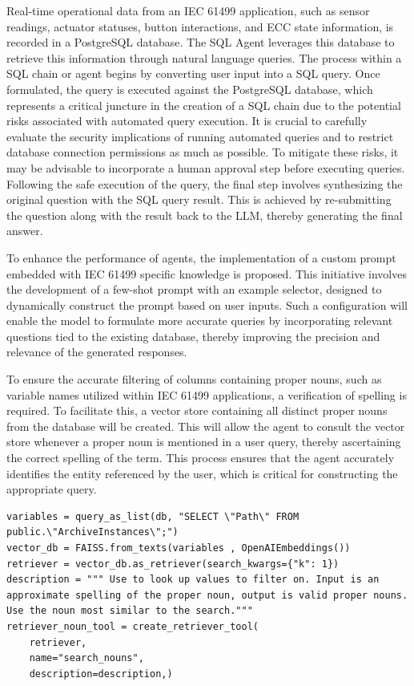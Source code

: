 \begin{bibunit}
Real-time operational data from an IEC 61499 application, such as sensor readings, actuator statuses, button interactions, and ECC state information, is recorded in a PostgreSQL database. The SQL Agent leverages this database to retrieve this information through natural language queries. The process within a SQL chain or agent begins by converting user input into a SQL query. Once formulated, the query is executed against the PostgreSQL database, which represents a critical juncture in the creation of a SQL chain due to the potential risks associated with automated query execution. It is crucial to carefully evaluate the security implications of running automated queries and to restrict database connection permissions as much as possible. To mitigate these risks, it may be advisable to incorporate a human approval step before executing queries. Following the safe execution of the query, the final step involves synthesizing the original question with the SQL query result. This is achieved by re-submitting the question along with the result back to the LLM, thereby generating the final answer.

To enhance the performance of agents, the implementation of a custom prompt embedded with IEC 61499 specific knowledge is proposed. This initiative involves the development of a few-shot prompt with an example selector, designed to dynamically construct the prompt based on user inputs. Such a configuration will enable the model to formulate more accurate queries by incorporating relevant questions tied to the existing database, thereby improving the precision and relevance of the generated responses.

To ensure the accurate filtering of columns containing proper nouns, such as variable names utilized within IEC 61499 applications, a  verification of spelling is required. To facilitate this, a vector store containing all distinct proper nouns from the database will be created. This will allow the agent to consult the vector store whenever a proper noun is mentioned in a user query, thereby ascertaining the correct spelling of the term. This process ensures that the agent accurately identifies the entity referenced by the user, which is critical for constructing the appropriate query.

\begin{lstlisting} 
variables = query_as_list(db, "SELECT \"Path\" FROM public.\"ArchiveInstances\";")
vector_db = FAISS.from_texts(variables , OpenAIEmbeddings())
retriever = vector_db.as_retriever(search_kwargs={"k": 1})
description = """ Use to look up values to filter on. Input is an approximate spelling of the proper noun, output is valid proper nouns. Use the noun most similar to the search."""
retriever_noun_tool = create_retriever_tool(
    retriever,
    name="search_nouns",
    description=description,)
\end{lstlisting}


\end{bibunit}

